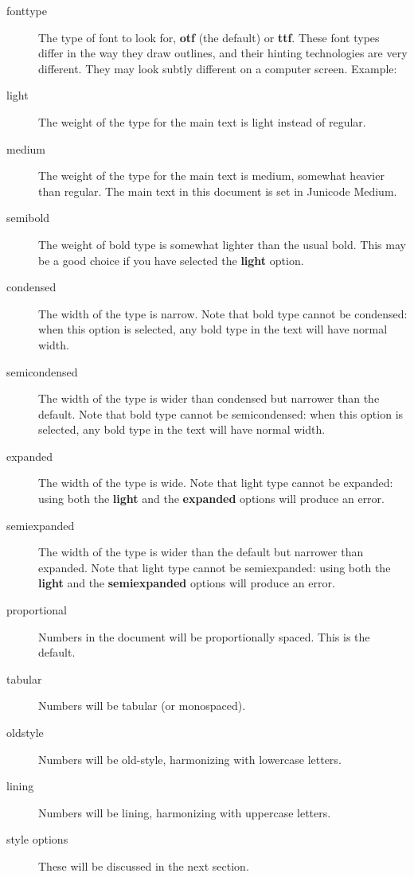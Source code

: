 \documentclass{article}
\begin{document}
\begin{description}
\item[fonttype] The type of font to look for, \textbf{otf} (the default) or \textbf{ttf}.
These font types differ in the
way they draw outlines, and their hinting technologies are very different. They may look subtly
different on a computer screen. Example:\\
\hspace*{1in}{\verb|\usepackage[fonttype=ttf]{junicode}|}
\item[light] The weight of the type for the main text is light instead of regular.
\item[medium] The weight of the type for the main text is medium, somewhat heavier than regular.
The main text in this document is set in Junicode Medium.
\item[semibold] The weight of bold type is somewhat lighter than the usual bold. This may be a
good choice if you have selected the \textbf{light} option.
\item[condensed] The width of the type is narrow. Note that bold type cannot be condensed: when
this option is selected, any bold type in the text will have normal width.
\item[semicondensed] The width of the type is wider than condensed but narrower than the default.
Note that bold type cannot be semicondensed: when this option is selected, any bold type in the
text will have normal width.
\item[expanded] The width of the type is wide. Note that light type cannot be expanded: using
both the \textbf{light} and the \textbf{expanded} options will produce an error.
\item[semiexpanded] The width of the type is wider than the default but narrower than expanded.
Note that light type cannot be semiexpanded: using both the \textbf{light} and the \textbf{semiexpanded} options
will produce an error.
\item[proportional] Numbers in the document will be proportionally spaced. This is the default.
\item[tabular] Numbers will be tabular (or monospaced).
\item[oldstyle] Numbers will be old-style, harmonizing with lowercase letters.
\item[lining] Numbers will be lining, harmonizing with uppercase letters.
\item[style options] These will be discussed in the next section.
\end{description}
\end{document}
